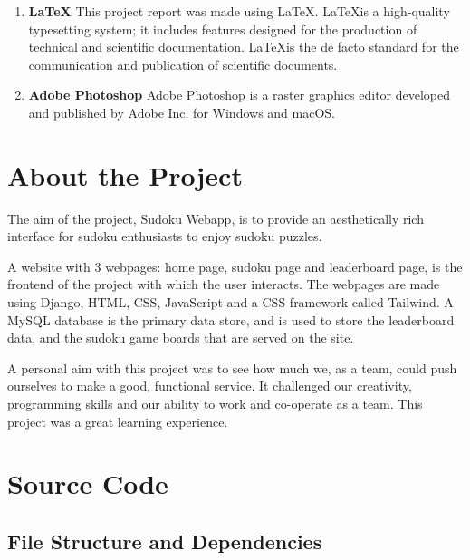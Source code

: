 \documentclass[12pt, a4paper]{report}
\begin{document}
\begin{enumerate}
        \item \textbf{\LaTeX} \newline
        This project report was made using \LaTeX. \LaTeX is a high-quality typesetting system; it includes features designed for the production of technical and scientific documentation. \LaTeX is the de facto standard for the communication and publication of scientific documents.
        \item \textbf{Adobe Photoshop} \newline
        Adobe Photoshop is a raster graphics editor developed and published by Adobe Inc. for Windows and macOS.
    \end{enumerate}
    
    
  \newpage
  \section{About the Project}
  The aim of the project, Sudoku Webapp, is to provide an aesthetically rich interface for sudoku enthusiasts to enjoy sudoku puzzles.\newline

  A website with 3 webpages: home page, sudoku page and leaderboard page, is the frontend of the project with which the user interacts. The webpages are made using Django, HTML, CSS, JavaScript and a CSS framework called Tailwind. A MySQL database is the primary data store, and is used to store the leaderboard data, and the sudoku game boards that are served on the site.\newline

  A personal aim with this project was to see how much we, as a team, could push ourselves to make a good, functional service. It challenged our creativity, programming skills and our ability to work and co-operate as a team. This project was a great learning experience.

  
  \newpage
  \section{Source Code}
    \subsection{File Structure and Dependencies}
\end{document}
